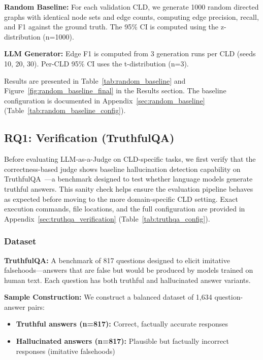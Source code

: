 \textbf{Random Baseline:} For each validation CLD, we generate 1000 random directed graphs with identical node sets and edge counts, computing edge precision, recall, and F1 against the ground truth. The 95\% CI is computed using the z-distribution (n=1000).

\textbf{LLM Generator:} Edge F1 is computed from 3 generation runs per CLD (seeds 10, 20, 30). Per-CLD 95\% CI uses the t-distribution (n=3).

Results are presented in Table~\ref{tab:random_baseline} and Figure~\ref{fig:random_baseline_final} in the Results section.
The baseline configuration is documented in Appendix~\ref{sec:random_baseline} (Table~\ref{tab:random_baseline_config}).

\subsection{RQ1: Verification (TruthfulQA)}
\label{sec:rq1_verification}

Before evaluating LLM-as-a-Judge on CLD-specific tasks, we first verify that the correctness-based judge shows baseline hallucination detection capability on TruthfulQA~\cite{lin2022truthfulqa}---a benchmark designed to test whether language models generate truthful answers. This sanity check helps ensure the evaluation pipeline behaves as expected before moving to the more domain-specific CLD setting.
Exact execution commands, file locations, and the full configuration are provided in Appendix~\ref{sec:truthqa_verification} (Table~\ref{tab:truthqa_config}).

\subsubsection{Dataset}

\textbf{TruthfulQA:} A benchmark of 817 questions designed to elicit imitative falsehoods---answers that are false but would be produced by models trained on human text. Each question has both truthful and hallucinated answer variants.

\textbf{Sample Construction:} We construct a balanced dataset of 1,634 question-answer pairs:
\begin{itemize}[noitemsep]
    \item \textbf{Truthful answers (n=817):} Correct, factually accurate responses
    \item \textbf{Hallucinated answers (n=817):} Plausible but factually incorrect responses (imitative falsehoods)
\end{itemize}


